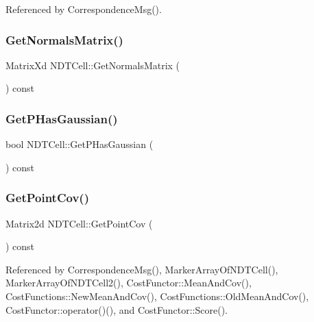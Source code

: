 Referenced by Correspondence\+Msg().

\mbox{\label{classNDTCell_aa868a56366702ac5d5871c10af438a66}} 
\subsubsection{\texorpdfstring{Get\+Normals\+Matrix()}{GetNormalsMatrix()}}
{\footnotesize\ttfamily Matrix\+Xd N\+D\+T\+Cell\+::\+Get\+Normals\+Matrix (\begin{DoxyParamCaption}{ }\end{DoxyParamCaption}) const}

\mbox{\label{classNDTCell_ac4ba033f59542e40722105b6aec5540f}} 
\subsubsection{\texorpdfstring{Get\+P\+Has\+Gaussian()}{GetPHasGaussian()}}
{\footnotesize\ttfamily bool N\+D\+T\+Cell\+::\+Get\+P\+Has\+Gaussian (\begin{DoxyParamCaption}{ }\end{DoxyParamCaption}) const\hspace{0.3cm}{\ttfamily [inline]}}

\mbox{\label{classNDTCell_a0766397f0999272036edab26866c7c03}} 
\subsubsection{\texorpdfstring{Get\+Point\+Cov()}{GetPointCov()}}
{\footnotesize\ttfamily Matrix2d N\+D\+T\+Cell\+::\+Get\+Point\+Cov (\begin{DoxyParamCaption}{ }\end{DoxyParamCaption}) const\hspace{0.3cm}{\ttfamily [inline]}}



Referenced by Correspondence\+Msg(), Marker\+Array\+Of\+N\+D\+T\+Cell(), Marker\+Array\+Of\+N\+D\+T\+Cell2(), Cost\+Functor\+::\+Mean\+And\+Cov(), Cost\+Functions\+::\+New\+Mean\+And\+Cov(), Cost\+Functions\+::\+Old\+Mean\+And\+Cov(), Cost\+Functor\+::operator()(), and Cost\+Functor\+::\+Score().


